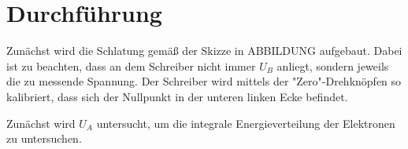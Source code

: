 \section{Durchführung}
\label{sec:Durchführung}


Zunächst wird die Schlatung gemäß der Skizze in ABBILDUNG aufgebaut. Dabei ist zu beachten, dass an dem Schreiber nicht immer $U_B$ anliegt, sondern jeweils die zu messende Spannung.
Der Schreiber wird mittels der "Zero"-Drehknöpfen so kalibriert, dass sich der Nullpunkt in der unteren linken Ecke befindet.

Zunächst wird $U_A$ untersucht, um die integrale Energieverteilung der Elektronen zu untersuchen.
